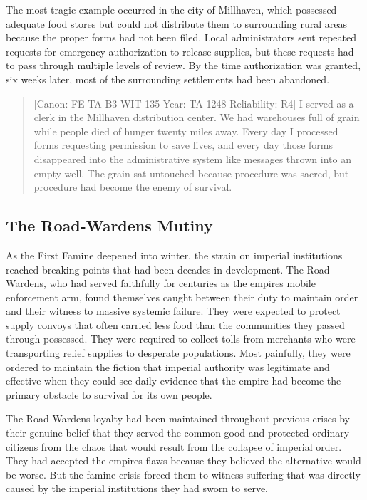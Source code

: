 The most tragic example occurred in the city of Millhaven, which
possessed adequate food stores but could not distribute them to
surrounding rural areas because the proper forms had not been filed.
Local administrators sent repeated requests for emergency authorization
to release supplies, but these requests had to pass through multiple
levels of review. By the time authorization was granted, six weeks
later, most of the surrounding settlements had been abandoned.

\begin{quote}
{[}Canon: FE-TA-B3-WIT-135 \textbar{} Year: TA 1248 \textbar{}
Reliability: R4{]} I served as a clerk in the Millhaven distribution
center. We had warehouses full of grain while people died of hunger
twenty miles away. Every day I processed forms requesting permission to
save lives, and every day those forms disappeared into the
administrative system like messages thrown into an empty well. The grain
sat untouched because procedure was sacred, but procedure had become the
enemy of survival.
\end{quote}

\subsection{The Road-Wardens\textquotesingle{}
Mutiny}\label{the-road-wardens-mutiny}

As the First Famine deepened into winter, the strain on imperial
institutions reached breaking points that had been decades in
development. The Road-Wardens, who had served faithfully for centuries
as the empire\textquotesingle s mobile enforcement arm, found themselves
caught between their duty to maintain order and their witness to massive
systemic failure. They were expected to protect supply convoys that
often carried less food than the communities they passed through
possessed. They were required to collect tolls from merchants who were
transporting relief supplies to desperate populations. Most painfully,
they were ordered to maintain the fiction that imperial authority was
legitimate and effective when they could see daily evidence that the
empire had become the primary obstacle to survival for its own people.

The Road-Wardens\textquotesingle{} loyalty had been maintained
throughout previous crises by their genuine belief that they served the
common good and protected ordinary citizens from the chaos that would
result from the collapse of imperial order. They had accepted the
empire\textquotesingle s flaws because they believed the alternative
would be worse. But the famine crisis forced them to witness suffering
that was directly caused by the imperial institutions they had sworn to
serve.

